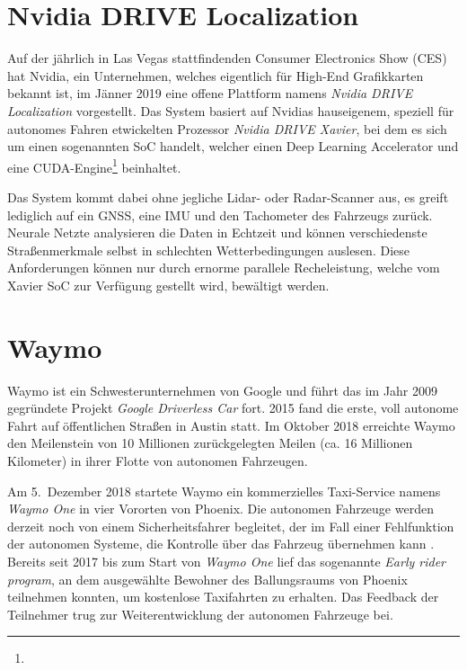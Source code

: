 \section{Nvidia DRIVE Localization}

Auf der jährlich in Las Vegas stattfindenden Consumer Electronics Show (CES) hat Nvidia, ein Unternehmen, welches eigentlich für High-End Grafikkarten bekannt ist, im Jänner 2019 eine offene Plattform namens \emph{Nvidia DRIVE Localization} vorgestellt. Das System basiert auf Nvidias hauseigenem, speziell für autonomes Fahren etwickelten Prozessor \emph{Nvidia DRIVE Xavier}, bei dem es sich um einen sogenannten \ac{SoC} handelt, welcher einen Deep Learning Accelerator und eine CUDA-Engine\footnote{} beinhaltet. 

Das System kommt dabei ohne jegliche \acs{Lidar}- oder \acs{Radar}-Scanner aus, es greift lediglich auf ein \ac{GNSS}, eine \ac{IMU} und den Tachometer des Fahrzeugs zurück. Neurale Netzte analysieren die Daten in Echtzeit und können verschiedenste Straßenmerkmale selbst in schlechten Wetterbedingungen auslesen. Diese Anforderungen können nur durch ernorme parallele Recheleistung, welche vom Xavier \ac{SoC} zur Verfügung gestellt wird, bewältigt werden. 


\section{Waymo}

Waymo ist ein Schwesterunternehmen von Google und führt das im Jahr 2009 gegründete Projekt \emph{Google Driverless Car} fort. 2015 fand die erste, voll autonome Fahrt auf öffentlichen Straßen in Austin statt. Im Oktober 2018 erreichte Waymo den Meilenstein von 10 Millionen zurückgelegten Meilen (ca. 16 Millionen Kilometer) in ihrer Flotte von autonomen Fahrzeugen.

Am 5.\ Dezember 2018 startete Waymo ein kommerzielles Taxi-Service namens \emph{Waymo One} in vier Vororten von Phoenix. Die autonomen Fahrzeuge werden derzeit noch von einem Sicherheitsfahrer begleitet, der im Fall einer Fehlfunktion der autonomen Systeme, die Kontrolle über das Fahrzeug übernehmen kann . Bereits seit 2017 bis zum Start von \emph{Waymo One} lief das sogenannte \emph{Early rider program}, an dem ausgewählte Bewohner des Ballungsraums von Phoenix teilnehmen konnten, um kostenlose Taxifahrten zu erhalten. Das Feedback der Teilnehmer trug zur Weiterentwicklung der autonomen Fahrzeuge bei.


